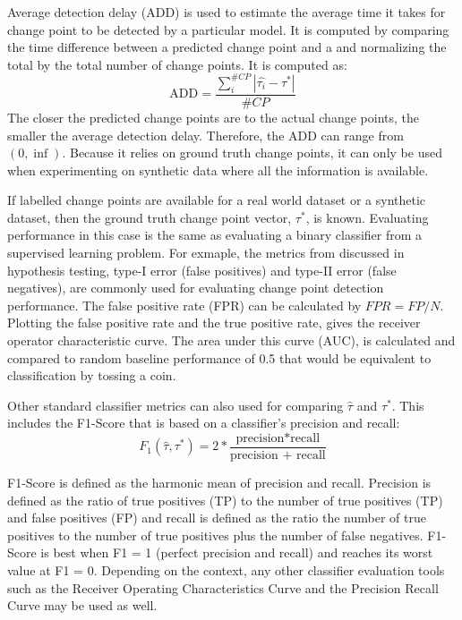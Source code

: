 Average detection delay (ADD) is used to estimate the average time it takes for change point to be detected by a particular model. It is computed by comparing the time difference between a predicted change point and a and normalizing the total by the total number of change points. It is computed as:
\begin{equation}
\text{ADD} = \frac{\sum_i^{\#CP} |\hat{\tau_i} - \tau^*|}{\#CP}
\end{equation}
The closer the predicted change points are to the actual change points, the smaller the average detection delay. Therefore, the ADD can range from $(0, \inf)$. Because it relies on ground truth change points, it can only be used when experimenting on synthetic data where all the information is available.

If labelled change points are available for a real world dataset or a synthetic dataset, then the ground truth change point vector, $\tau^*$, is known. Evaluating performance in this case is the same as evaluating a binary classifier from a supervised learning problem. For exmaple, the metrics from discussed in hypothesis testing, type-I error (false positives) and type-II error (false negatives), are commonly used for evaluating change point detection performance. The false positive rate (FPR) can be calculated by $FPR = FP / N$. Plotting the false positive rate and the true positive rate, gives the receiver operator characteristic curve. The area under this curve (AUC), is calculated and compared to random baseline performance of 0.5 that would be equivalent to classification by tossing a coin.


Other standard classifier metrics can also used for comparing $\hat{\tau}$ and $\tau^*$. This includes the  F1-Score that is based on a classifier's precision and recall:
\begin{equation}
F_1(\hat{\tau}, \tau^*) = 2 * \frac{\text{precision*recall}}{\text{precision + recall}}
\end{equation}

 F1-Score is defined as the harmonic mean of precision and recall. Precision is defined as the ratio of true positives (TP) to the
number of true positives (TP) and false positives (FP) and recall is defined as the ratio the number of true positives to the
number of true positives plus the number of false negatives. F1-Score is best when F1 = 1 (perfect precision and recall) and reaches its worst value at F1 = 0. Depending on the context, any other classifier evaluation tools such as the Receiver Operating Characteristics Curve and the Precision Recall Curve may be used as well.

